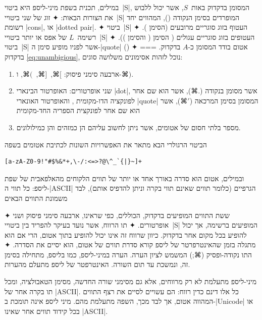 במילים, תכנית בשפת מיני-ליספ היא ביטוי~\E|S|, המסומן בדקדוק באות~$S$, אשר יכול
ללבוש את הצורות הבאות:
✦ זוג של שני ביטויי~\E|S| המופרדים בסימן הנקודה (), המהווים יחד רשומת
  \E|cons|, או \E|dotted pair|.
✦ ביטוי~\E|S| העטוף בזוג סוגריים מרובעים (הסימן \cc[ והסימן \cc]).
✦ רשימה~$L$ של אפס או יותר ביטויי~\E|S| העטופים בזוג סוגריים עגולים  ( הסימן \cc( והסימן \cc)).
✦ ביטוי~\E|S| אשר לפניו מופיע סימן ה-\E|quote| ()
✦ אטום בודד המסומן כ-$A$ בדקדוק.
===
בדקדוק \cref{eq:unambigious}, נוכל לזהות אסימונים משלושה סוגים: 
\begin{enumerate}
\item ארבעה סימני פיסוק: $⌘[$,~$⌘]$,~$⌘($, ו-$⌘)$.
\item שני אופרטורים:  האופרטור הבינארי \E|dot|, אשר מסומן בנקודה ($⌘.$), אשר
  הוא שם אחר לפונקציה הדו-מקומית , והאופרטור האונארי \E|quote|
  המסומן בסימן המרכאה ($⌘'$), אשר הוא שם אחר לפונקצית הספריה החד-מקומית 
\item מספר בלתי חסום של אטומים, אשר ניתן לחשוב עליהם הן כמזהים והן כמילולונים.
\end{enumerate}

הביטוי הרגולרי הבא מתאר את האפשרויות השונות לכתיבת אטומים בשפה
\begin{LTR}
\begin{verbatim}
[a-zA-Z0-9!"#$%&*+,\-/:<=>?@\^_`{|}~]+
\end{verbatim}
\end{LTR}

ובמילים, אטום הוא סדרה באורך אחד או יותר של תווים הלקוחים מהאלפאבית של שפת ליספ:
כל תווי ה-\E|ASCII| הגרפיים (כלומר תווים שאינם תווי בקרה וניתן להדפיס אותם),
לבד משמונת התווים הבאים \begin{itemize}
    ✦ ששת התווים המופיעים בדקדוק, הכוללים, כפי שראינו, ארבעה סימני פיסוק ושני אופרטורים. 
    ✦ תו הרווח, אשר נועד בעיקר להפריד בין ביטויי~\E|S| המופיעים ברשימה, אך יכול
    להופיע בכל מקום אחר בדקדוק. כיוון שרווח זה אינו יכול להופיע בתוך אטום, הרי
    אם הוא מתגלה בזמן שהאינטרפרטר של ליספ קורא סדרת תווים של אטום, הוא יסיים את
    הסדרה.
    ✦ התו נקודה-ופסיק (⌘;) המשמש לציון הערה. הערה במיני-ליספ, כמו בליספ, מתחילה
    בסימן זה, ונמשכת עד תום השורה. האינטרפטר של ליספ מתעלם מהערות.
\end{itemize}
    מיני-ליספ מתעלמת לא רק מרווחים, אלא גם מסימני שורה החדשה, מסימן הטאבולציה,
    ומכל תו בקרה אחר של \E|ASCII|. כל אלו דינם כדין רווח: הם עשויים לסיים את רצף
    התווים המהווה אטום, אך לבד מכך, השפה מתעלמת מהם.  מיני ליספ אינה תומכת
    ב-\E|Unicode| או בכל קידוד תווים אחר שאינו \E|ASCII|.


